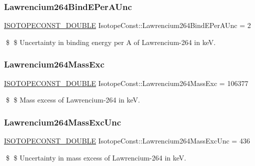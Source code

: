 \subsubsection{\texorpdfstring{Lawrencium264\+Bind\+E\+Per\+A\+Unc}{Lawrencium264BindEPerAUnc}}
{\footnotesize\ttfamily \mbox{\hyperlink{group___isotope_const-_macros_ga8f45a7272ce02c0b4c65c44636ed719a}{I\+S\+O\+T\+O\+P\+E\+C\+O\+N\+S\+T\+\_\+\+D\+O\+U\+B\+LE}} Isotope\+Const\+::\+Lawrencium264\+Bind\+E\+Per\+A\+Unc = 2}

\$ \$ Uncertainty in binding energy per A of Lawrencium-\/264 in keV. \mbox{\label{group___isotope_const-_lawrencium-_lr264_ga54bba16ba8b6a2167973610620d504fb}} 
\subsubsection{\texorpdfstring{Lawrencium264\+Mass\+Exc}{Lawrencium264MassExc}}
{\footnotesize\ttfamily \mbox{\hyperlink{group___isotope_const-_macros_ga8f45a7272ce02c0b4c65c44636ed719a}{I\+S\+O\+T\+O\+P\+E\+C\+O\+N\+S\+T\+\_\+\+D\+O\+U\+B\+LE}} Isotope\+Const\+::\+Lawrencium264\+Mass\+Exc = 106377}

\$ \$ Mass excess of Lawrencium-\/264 in keV. \mbox{\label{group___isotope_const-_lawrencium-_lr264_ga682bee7700df06f5f0bea6264039bb26}} 
\subsubsection{\texorpdfstring{Lawrencium264\+Mass\+Exc\+Unc}{Lawrencium264MassExcUnc}}
{\footnotesize\ttfamily \mbox{\hyperlink{group___isotope_const-_macros_ga8f45a7272ce02c0b4c65c44636ed719a}{I\+S\+O\+T\+O\+P\+E\+C\+O\+N\+S\+T\+\_\+\+D\+O\+U\+B\+LE}} Isotope\+Const\+::\+Lawrencium264\+Mass\+Exc\+Unc = 436}

\$ \$ Uncertainty in mass excess of Lawrencium-\/264 in keV. \mbox{\label{group___isotope_const-_lawrencium-_lr264_ga4bfdcbfb3cd317eedfb733afcad989fa}} 
